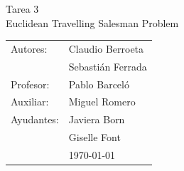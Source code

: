 \documentclass[12pt,letterpaper, margin = 3cm]{article}
\begin{document}
\newpage
\pagestyle{fancy}
\fancyhf{}
\vspace*{5cm}
\begin{center}
\huge  {Tarea 3}\\
\Huge {Euclidean Travelling Salesman Problem}\\
\vspace{6cm}
\end{center}
\vfill
\begin{flushright}
\begin{tabular}{ll}
Autores: & Claudio Berroeta\\
& Sebastián Ferrada \\
Profesor: & Pablo Barceló\\
Auxiliar: & Miguel Romero\\
Ayudantes: & Javiera Born\\
& Giselle Font\\
& \today\\
\end{tabular}
\end{flushright}

\newpage
\pagestyle{fancy}
\fancyhf{}

\fancyhead[R]{\small \rm \textbf{\thepage}} %



\renewcommand{\sectionmark}[1]{\markright{\thesection.\ #1}}
\renewcommand{\headrulewidth}{0.5pt}
\renewcommand{\footrulewidth}{0.5pt}
\newcommand{\fancyfootnotetext}[2]{%
  \fancypagestyle{dingens}{%
    \fancyfoot[LO,RE]{\parbox{12cm}{\footnotemark[#1]\footnotesize #2}}%
  }%
  \thispagestyle{dingens}%
}
\end{document}
